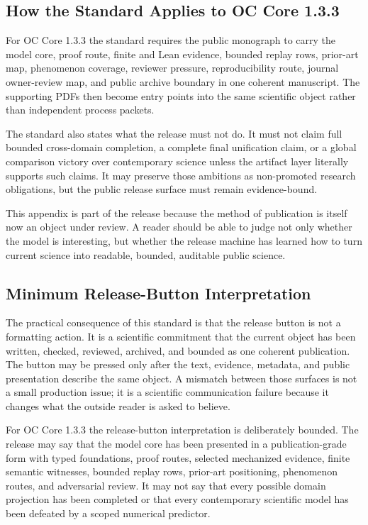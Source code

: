 \subsection{How the Standard Applies to OC Core 1.3.3}

For OC Core 1.3.3 the standard requires the public monograph to carry the model core, proof route, finite and Lean evidence, bounded replay rows, prior-art map, phenomenon coverage, reviewer pressure, reproducibility route, journal owner-review map, and public archive boundary in one coherent manuscript. The supporting PDFs then become entry points into the same scientific object rather than independent process packets.


The standard also states what the release must not do. It must not claim full bounded cross-domain completion, a complete final unification claim, or a global comparison victory over contemporary science unless the artifact layer literally supports such claims. It may preserve those ambitions as non-promoted research obligations, but the public release surface must remain evidence-bound.


This appendix is part of the release because the method of publication is itself now an object under review. A reader should be able to judge not only whether the model is interesting, but whether the release machine has learned how to turn current science into readable, bounded, auditable public science.


\subsection{Minimum Release-Button Interpretation}

The practical consequence of this standard is that the release button is not a formatting action. It is a scientific commitment that the current object has been written, checked, reviewed, archived, and bounded as one coherent publication. The button may be pressed only after the text, evidence, metadata, and public presentation describe the same object. A mismatch between those surfaces is not a small production issue; it is a scientific communication failure because it changes what the outside reader is asked to believe.


For OC Core 1.3.3 the release-button interpretation is deliberately bounded. The release may say that the model core has been presented in a publication-grade form with typed foundations, proof routes, selected mechanized evidence, finite semantic witnesses, bounded replay rows, prior-art positioning, phenomenon routes, and adversarial review. It may not say that every possible domain projection has been completed or that every contemporary scientific model has been defeated by a scoped numerical predictor.


